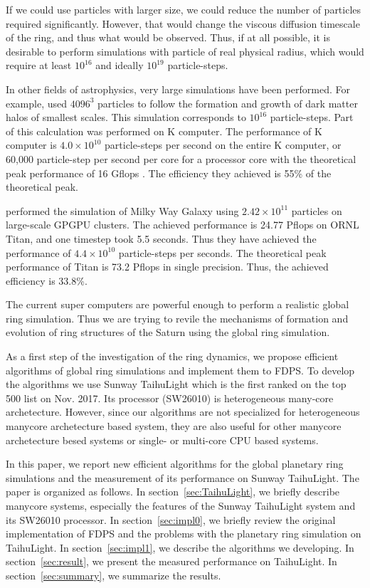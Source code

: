 \documentclass[]{pasj01}
\begin{document}
If we could use particles with larger size, we could reduce the number
of particles required significantly. However, that would change the
viscous diffusion timescale of the ring, and thus what would be
observed. Thus, if at all possible, it is desirable to perform
simulations with particle of real physical radius, which would require
at least $10^{16}$ and ideally $10^{19}$ particle-steps.

In other fields of astrophysics, very large simulations have been
performed. For example, \citet{Ishiyama2014} used $4096^3$ particles
to follow the formation and growth of dark matter halos of smallest
scales. This simulation corresponds to $10^{16}$ particle-steps. Part
of this calculation was performed on K computer. The performance of K
computer is $4.0\times 10^{10}$ particle-steps per second on the
entire K computer, or 60,000 particle-step per second per core for a
processor core with the theoretical peak performance of 16 Gflops
\citep{Ishiyamaetal2012}. The efficiency they achieved is 55\% of the
theoretical peak.

\citet{Bedorfetal2014} performed the simulation of Milky Way Galaxy
using $2.42 \times 10^{11}$ particles on large-scale GPGPU
clusters. The achieved performance is 24.77 Pflops on ORNL Titan, and
one timestep took 5.5 seconds. Thus they have achieved the performance
of $4.4 \times 10^{10}$ particle-steps per seconds. The theoretical
peak performance of Titan is 73.2 Pflops in single precision. Thus,
the achieved efficiency is 33.8\%.

The current super computers are powerful enough to perform a realistic
global ring simulation. Thus we are trying to revile the mechanisms of
formation and evolution of ring structures of the Saturn using the
global ring simulation.

As a first step of the investigation of the ring dynamics, we propose
efficient algorithms of global ring simulations and implement them to
FDPS. To develop the algorithms we use Sunway TaihuLight which is the
first ranked on the top 500 list on Nov. 2017. Its processor (SW26010)
is heterogeneous many-core archetecture. However, since our algorithms
are not specialized for heterogeneous manycore archetecture based
system, they are also useful for other manycore archetecture besed
systems or single- or multi-core CPU based systems.

In this paper, we report new efficient algorithms for the global
planetary ring simulations and the measurement of its performance on
Sunway TaihuLight. The paper is organized as follows. In
section~\ref{sec:TaihuLight}, we briefly describe manycore systems,
especially the features of the Sunway TaihuLight system and its
SW26010 processor. In section~\ref{sec:impl0}, we briefly review the
original implementation of FDPS and the problems with the planetary
ring simulation on TaihuLight. In section~\ref{sec:impl1}, we describe
the algorithms we developing. In section~\ref{sec:result}, we present
the measured performance on TaihuLight. In section~\ref{sec:summary},
we summarize the results.
\end{document}
